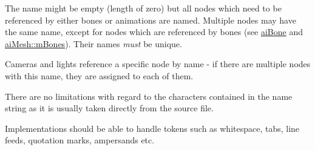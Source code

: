 The name might be empty (length of zero) but all nodes which need to be referenced by either bones or animations are named. Multiple nodes may have the same name, except for nodes which are referenced by bones (see \hyperlink{structai_bone}{ai\-Bone} and \hyperlink{structai_mesh_a0c0582a7f45b340b6a33552c53232539}{ai\-Mesh\-::m\-Bones}). Their names {\itshape must} be unique.

Cameras and lights reference a specific node by name -\/ if there are multiple nodes with this name, they are assigned to each of them. \par
 There are no limitations with regard to the characters contained in the name string as it is usually taken directly from the source file.

Implementations should be able to handle tokens such as whitespace, tabs, line feeds, quotation marks, ampersands etc.

